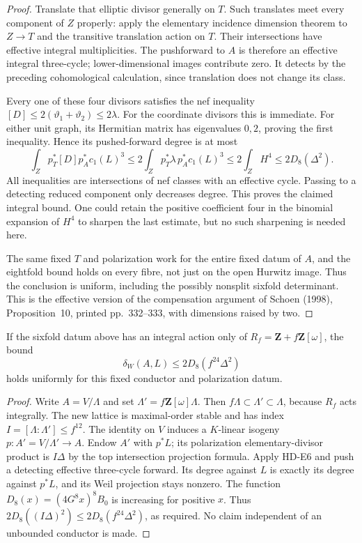 \begin{proof}
Translate that elliptic divisor generally on $T$. Such translates
meet every component of $Z$ properly: apply the elementary incidence
dimension theorem to $Z\to T$ and the transitive translation action
on $T$. Their intersections have effective integral multiplicities.
The pushforward to $A$ is therefore an effective integral three-cycle;
lower-dimensional images contribute zero. It detects by the preceding
cohomological calculation, since translation does not change its class.

Every one of these four divisors satisfies the nef inequality
$[D]\le2(\vartheta_1+\vartheta_2)\le2\lambda$.
For the coordinate divisors this is immediate. For either unit graph,
its Hermitian matrix has eigenvalues $0,2$, proving the first
inequality. Hence its pushed-forward degree is at most
\[
 \int_Z p_T^*[D]p_A^*c_1(L)^3
 \le 2\int_Z p_T^*\lambda\,p_A^*c_1(L)^3
 \le2\int_Z H^4
 \le2D_8(\Delta^2).
\]
All inequalities are intersections of nef classes with an effective
cycle. Passing to a detecting reduced component only decreases degree.
This proves the claimed integral bound. One could retain the positive
coefficient four in the binomial expansion of $H^4$ to sharpen the
last estimate, but no such sharpening is needed here.

The same fixed $T$ and polarization work for the entire fixed datum
of $A$, and the eightfold bound holds on every fibre, not just on the
open Hurwitz image. Thus the conclusion is uniform, including the
possibly nonsplit sixfold determinant. This is the effective version
of the compensation argument of Schoen (1998), Proposition~10,
printed pp.~332--333, with dimensions raised by two.
\end{proof}

\begin{corollary}
\label{HD-E6b}
If the sixfold datum above has an integral action only of
$R_f=\mathbf Z+f\mathbf Z[\omega]$, the bound
\[
 \delta_W(A,L)\le2D_8(f^{24}\Delta^2)
\]
holds uniformly for this fixed conductor and polarization datum.
\end{corollary}
\begin{proof}
Write $A=V/\Lambda$ and set $\Lambda'=f\mathbf Z[\omega]\Lambda$.
Then $f\Lambda\subset\Lambda'\subset\Lambda$, because $R_f$ acts
integrally. The new lattice is maximal-order stable and has index
$I=[\Lambda:\Lambda']\le f^{12}$. The identity on $V$ induces a
$K$-linear isogeny $p:A'=V/\Lambda'\to A$. Endow $A'$ with $p^*L$;
its polarization elementary-divisor product is $I\Delta$ by the
top intersection projection formula. Apply HD-E6 and push a detecting
effective three-cycle forward. Its degree against $L$ is exactly
its degree against $p^*L$, and its Weil projection stays nonzero.
The function $D_8(x)=(4G^8x)^8B_0$ is increasing for positive $x$.
Thus $2D_8((I\Delta)^2)\le2D_8(f^{24}\Delta^2)$, as required.
No claim independent of an unbounded conductor is made.
\end{proof}
